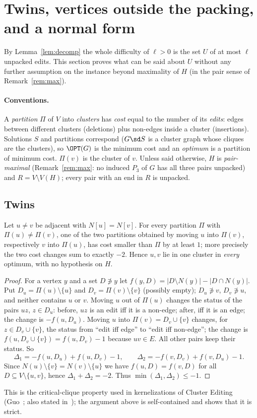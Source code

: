 \section{Twins, vertices outside the packing, and a normal form}\label{sec:structure}
By Lemma~\ref{lem:decomp} the whole difficulty of $\ell>0$ is the set $U$ of at most $\ell$ unpacked edits. This section proves what can be said about $U$ without any further assumption on the instance beyond maximality of $H$ (in the pair sense of Remark~\ref{rem:max}).

\paragraph{Conventions.} A \emph{partition} $\Pi$ of $V$ into \emph{clusters} has \emph{cost} equal to the number of its \emph{edits}: edges between different clusters (deletions) plus non-edges inside a cluster (insertions). Solutions $S$ and partitions correspond ($G\sd S$ is a cluster graph whose cliques are the clusters), so $\OPT(G)$ is the minimum cost and an \emph{optimum} is a partition of minimum cost. $\Pi(v)$ is the cluster of $v$. Unless said otherwise, $H$ is \emph{pair-maximal} (Remark~\ref{rem:max}: no induced $P_3$ of $G$ has all three pairs unpacked) and $R=V\setminus V(H)$; every pair with an end in $R$ is unpacked.

\subsection{Twins}
\begin{lemma}\label{lem:twin}
Let $u\ne v$ be adjacent with $N[u]=N[v]$. For every partition $\Pi$ with $\Pi(u)\ne\Pi(v)$, one of the two partitions obtained by moving $u$ into $\Pi(v)$, respectively $v$ into $\Pi(u)$, has cost smaller than $\Pi$ by at least $1$; more precisely the two cost changes sum to exactly $-2$. Hence $u,v$ lie in one cluster in \emph{every} optimum, with no hypothesis on $H$.
\end{lemma}
\begin{proof}
For a vertex $y$ and a set $D\not\ni y$ let $f(y,D)=|D\setminus N(y)|-|D\cap N(y)|$. Put $D_u=\Pi(u)\setminus\{u\}$ and $D_v=\Pi(v)\setminus\{v\}$ (possibly empty); $D_u\not\ni v$, $D_v\not\ni u$, and neither contains $u$ or $v$. Moving $u$ out of $\Pi(u)$ changes the status of the pairs $uz$, $z\in D_u$: before, $uz$ is an edit iff it is a non-edge; after, iff it is an edge; the change is $-f(u,D_u)$. Moving $u$ into $\Pi(v)=D_v\cup\{v\}$ changes, for $z\in D_v\cup\{v\}$, the status from ``edit iff edge'' to ``edit iff non-edge''; the change is $f(u,D_v\cup\{v\})=f(u,D_v)-1$ because $uv\in E$. All other pairs keep their status. So
\[\Delta_1=-f(u,D_u)+f(u,D_v)-1,\qquad \Delta_2=-f(v,D_v)+f(v,D_u)-1 .\]
Since $N(u)\setminus\{v\}=N(v)\setminus\{u\}$ we have $f(u,D)=f(v,D)$ for all $D\subseteq V\setminus\{u,v\}$, hence $\Delta_1+\Delta_2=-2$. Thus $\min(\Delta_1,\Delta_2)\le-1$.
\end{proof}
This is the critical-clique property used in kernelizations of Cluster Editing (Guo~\cite{Guo09}; also stated in~\cite{BFK18}); the argument above is self-contained and shows that it is strict.


